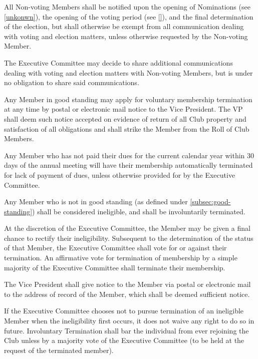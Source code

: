 \documentclass{bylaws}
\begin{document}
All Non-voting Members shall be notified upon the opening of Nominations (see \ref{unkonwn}), the opening of the voting period (see \ref{}), and the final determination of the election, but shall otherwise be exempt from all communication dealing with voting and election matters, unless otherwise requested by the Non-voting Member.

The Executive Committee may decide to share additional communications dealing with voting and election matters with Non-voting Members, but is under no obligation to share said communications.


\label{subsec:vol-term}
Any Member in good standing may apply for voluntary membership termination at any time by postal or electronic mail notice to the Vice President. The VP shall deem such notice accepted on evidence of return of all Club property and satisfaction of all obligations and shall strike the Member from the Roll of Club Members. 

Any Member who has not paid their dues for the current calendar year within 30 days of the annual meeting will have their membership automatically terminated for lack of payment of dues, unless otherwise provided for by the Executive Committee.

Any Member who is not in good standing (as defined under \ref{subsec:good-standing}) shall be considered ineligible, and shall be involuntarily terminated. 

At the discretion of the Executive Committee, the Member may be given a final chance to rectify their ineligibility. Subsequent to the determination of the status of that Member, the Executive Committee shall vote for or against their termination. An affirmative vote for termination of membership by a simple majority of the Executive Committee shall terminate their membership. 

The Vice President shall give notice to the Member via postal or electronic mail to the address of record of the Member, which shall be deemed sufficient notice. 

If the Executive Committee chooses not to pursue termination of an ineligible Member when the ineligibility first occurs, it does not waive any right to do so in future. Involuntary Termination shall bar the individual from ever rejoining the Club unless by a majority vote of the Executive Committee (to be held at the request of the terminated member). 
\end{document}
